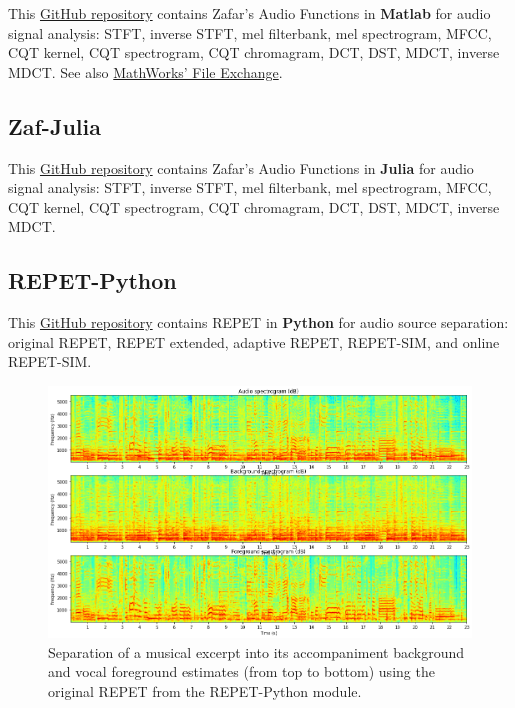 \documentclass{article}
\begin{document}
This \href{https://github.com/zafarrafii/Zaf-Matlab}{GitHub repository} contains Zafar's Audio Functions in \textbf{Matlab} for audio signal analysis: STFT, inverse STFT, mel filterbank, mel spectrogram, MFCC, CQT kernel, CQT spectrogram, CQT chromagram, DCT, DST, MDCT, inverse MDCT. See also \href{https://www.mathworks.com/matlabcentral/fileexchange/90501-zaf-matlab}{MathWorks' File Exchange}.


\subsection{Zaf-Julia}
\label{ssec:zaf-julia}

This \href{https://github.com/zafarrafii/Zaf-Julia}{GitHub repository} contains Zafar's Audio Functions in \textbf{Julia} for audio signal analysis: STFT, inverse STFT, mel filterbank, mel spectrogram, MFCC, CQT kernel, CQT spectrogram, CQT chromagram, DCT, DST, MDCT, inverse MDCT.


\subsection{REPET-Python}
\label{ssec:repet-python}

This \href{https://github.com/zafarrafii/REPET-Python}{GitHub repository} contains REPET in \textbf{Python} for audio source separation: original REPET, REPET extended, adaptive REPET, REPET-SIM, and online REPET-SIM.

\begin{figure}[!htb]
\centering
\includegraphics[width=\columnwidth]{Images/repet_original.png}
\caption{Separation of a musical excerpt into its accompaniment background and vocal foreground estimates (from top to bottom) using the original REPET from the REPET-Python module.}
\label{fig:repet_original}
\end{figure}
\end{document}
